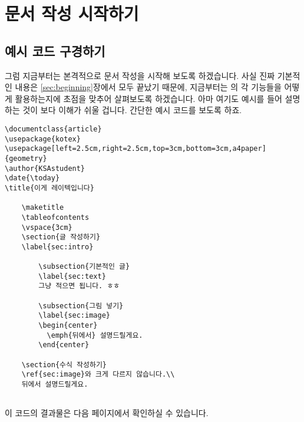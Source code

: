 
\newpage
\section{문서 작성 시작하기}
\label{sec:text}
\subsection{예시 코드 구경하기}
그럼 지금부터는 본격적으로 문서 작성을 시작해 보도록 하겠습니다.
사실 진짜 기본적인 내용은 \ref{sec:beginning}장에서 모두 끝났기 때문에, 지금부터는 \lt 의 각 기능들을 어떻게 활용하는지에 초점을 맞추어 살펴보도록 하겠습니다. 아마 여기도 예시를 들어 설명하는 것이 보다 이해가 쉬울 겁니다. 간단한 예시 코드를 보도록 하죠.
\begin{Verbatim}[frame=single]
\documentclass{article}
\usepackage{kotex}
\usepackage[left=2.5cm,right=2.5cm,top=3cm,bottom=3cm,a4paper]{geometry}
\author{KSAstudent}
\date{\today}
\title{이게 레이텍입니다}

    \maketitle
    \tableofcontents
    \vspace{3cm}
    \section{글 작성하기}
    \label{sec:intro}

        \subsection{기본적인 글}
        \label{sec:text}
        그냥 적으면 됩니다. ㅎㅎ
        
        \subsection{그림 넣기}
        \label{sec:image}
        \begin{center}
          \emph{뒤에서} 설명드릴게요.
        \end{center}

    \section{수식 작성하기}
    \ref{sec:image}와 크게 다르지 않습니다.\\
    뒤에서 설명드릴게요.


\end{Verbatim}
이 코드의 결과물은 다음 페이지에서 확인하실 수 있습니다.

